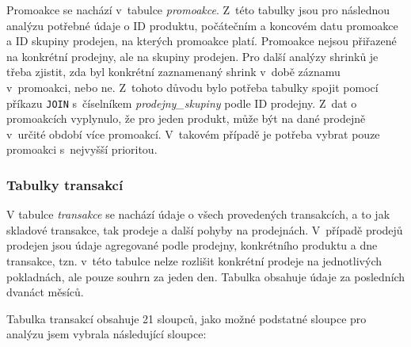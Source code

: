 Promoakce se nachází v~tabulce \emph{promoakce}. Z~této tabulky jsou pro následnou analýzu potřebné údaje o ID produktu, počátečním a koncovém datu promoakce a ID skupiny prodejen, na kterých promoakce platí. Promoakce nejsou přiřazené na konkrétní prodejny, ale na skupiny prodejen. Pro další analýzy shrinků je třeba zjistit, zda byl konkrétní zaznamenaný shrink v~době záznamu v~promoakci, nebo ne. Z~tohoto důvodu bylo potřeba tabulky spojit pomocí příkazu \texttt{JOIN} s~číselníkem \emph{prodejny\_skupiny} podle ID prodejny. Z~dat o promoakcích vyplynulo, že pro jeden produkt, může být na dané prodejně v~určité období více promoakcí. V~takovém případě je potřeba vybrat pouze promoakci s~nejvyšší prioritou.

\subsubsection{Tabulky transakcí}
V tabulce \emph{transakce} se nachází údaje o všech provedených transakcích, a to jak skladové transakce, tak prodeje a další pohyby na prodejnách. V~případě prodejů prodejen jsou údaje agregované podle prodejny, konkrétního produktu a dne transakce, tzn. v~této tabulce nelze rozlišit konkrétní prodeje na jednotlivých pokladnách, ale pouze souhrn za jeden den. Tabulka obsahuje údaje za posledních dvanáct měsíců.

Tabulka transakcí obsahuje 21 sloupců, jako možné podstatné sloupce pro analýzu jsem vybrala následující sloupce:


